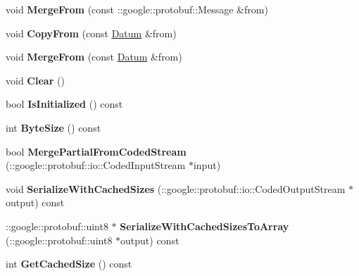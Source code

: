 \begin{DoxyCompactItemize}
\mbox{\label{classcaffe_1_1_datum_a0a5e31f5815864472205fc1998510be2}} 
void {\bfseries Merge\+From} (const \+::google\+::protobuf\+::\+Message \&from)
\item 
\mbox{\label{classcaffe_1_1_datum_a00a99c3cc2137407cf472a44dfe8a69a}} 
void {\bfseries Copy\+From} (const \mbox{\hyperlink{classcaffe_1_1_datum}{Datum}} \&from)
\item 
\mbox{\label{classcaffe_1_1_datum_aa63505abc5dff80a8f0212271e46546d}} 
void {\bfseries Merge\+From} (const \mbox{\hyperlink{classcaffe_1_1_datum}{Datum}} \&from)
\item 
\mbox{\label{classcaffe_1_1_datum_ada93a6d2a5379a43f050d23387b12102}} 
void {\bfseries Clear} ()
\item 
\mbox{\label{classcaffe_1_1_datum_a15c28ed72eff869c8edc1069931bdf58}} 
bool {\bfseries Is\+Initialized} () const
\item 
\mbox{\label{classcaffe_1_1_datum_a37d1339a58c2d2be8ef1c48183d411ed}} 
int {\bfseries Byte\+Size} () const
\item 
\mbox{\label{classcaffe_1_1_datum_a55fe5ea4de9d81cfcbf450b8ac9bf31d}} 
bool {\bfseries Merge\+Partial\+From\+Coded\+Stream} (\+::google\+::protobuf\+::io\+::\+Coded\+Input\+Stream $\ast$input)
\item 
\mbox{\label{classcaffe_1_1_datum_acfc77685a34a3869e9eb08c22ed809b7}} 
void {\bfseries Serialize\+With\+Cached\+Sizes} (\+::google\+::protobuf\+::io\+::\+Coded\+Output\+Stream $\ast$output) const
\item 
\mbox{\label{classcaffe_1_1_datum_ae580ff045c4bf5bff8f2f5922115362c}} 
\+::google\+::protobuf\+::uint8 $\ast$ {\bfseries Serialize\+With\+Cached\+Sizes\+To\+Array} (\+::google\+::protobuf\+::uint8 $\ast$output) const
\item 
\mbox{\label{classcaffe_1_1_datum_a620393c90b865c7a9706aeb2972de91d}} 
int {\bfseries Get\+Cached\+Size} () const

\end{DoxyCompactItemize}
